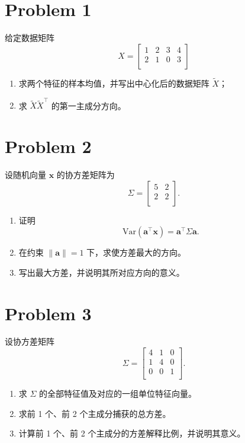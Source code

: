 \section*{Problem 1}

给定数据矩阵 \[
X = \begin{bmatrix}
    1 & 2 & 3 & 4 \\
    2 & 1 & 0 & 3 \\
\end{bmatrix}
\]
\begin{enumerate}
    \item 求两个特征的样本均值，并写出中心化后的数据矩阵 $\tilde{X}$；
    \item 求 $\tilde{X}\tilde{X}^\top$ 的第一主成分方向。
\end{enumerate}

\section*{Problem 2}

设随机向量 $\boldsymbol{x}$ 的协方差矩阵为 \[
\Sigma = \begin{bmatrix}
    5 & 2 \\
    2 & 2 \\
\end{bmatrix}.
\]
\begin{enumerate}
    \item 证明 \[\mathrm{Var} \left(\boldsymbol{a}^\top \boldsymbol{x} \right) = \boldsymbol{a}^\top \Sigma \boldsymbol{a}.\]
    \item 在约束 $\left\|\boldsymbol{a}\right\| = 1$ 下，求使方差最大的方向。
    \item 写出最大方差，并说明其所对应方向的意义。
\end{enumerate}

\section*{Problem 3}

设协方差矩阵 \[\Sigma = \begin{bmatrix}
    4 & 1 & 0 \\
    1 & 4 & 0 \\
    0 & 0 & 1 \\
\end{bmatrix}.\]
\begin{enumerate}
    \item 求 $\Sigma$ 的全部特征值及对应的一组单位特征向量。
    \item 求前 1 个、前 2 个主成分捕获的总方差。
    \item 计算前 1 个、前 2 个主成分的方差解释比例，并说明其意义。
\end{enumerate}
